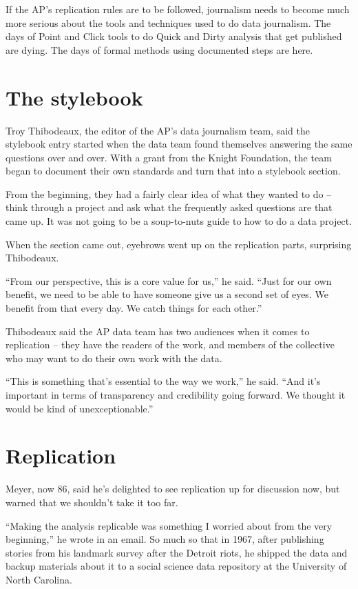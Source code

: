 \documentclass[]{book}
\begin{document}
If the AP's replication rules are to be followed, journalism needs to become much more serious about the tools and techniques used to do data journalism. The days of Point and Click tools to do Quick and Dirty analysis that get published are dying. The days of formal methods using documented steps are here.

\hypertarget{the-stylebook}{%
\section{The stylebook}\label{the-stylebook}}

Troy Thibodeaux, the editor of the AP's data journalism team, said the stylebook entry started when the data team found themselves answering the same questions over and over. With a grant from the Knight Foundation, the team began to document their own standards and turn that into a stylebook section.

From the beginning, they had a fairly clear idea of what they wanted to do -- think through a project and ask what the frequently asked questions are that came up. It was not going to be a soup-to-nuts guide to how to do a data project.

When the section came out, eyebrows went up on the replication parts, surprising Thibodeaux.

``From our perspective, this is a core value for us,'' he said. ``Just for our own benefit, we need to be able to have someone give us a second set of eyes. We benefit from that every day. We catch things for each other.''

Thibodeaux said the AP data team has two audiences when it comes to replication -- they have the readers of the work, and members of the collective who may want to do their own work with the data.

``This is something that's essential to the way we work,'' he said. ``And it's important in terms of transparency and credibility going forward. We thought it would be kind of unexceptionable.''

\hypertarget{replication}{%
\section{Replication}\label{replication}}

Meyer, now 86, said he's delighted to see replication up for discussion now, but warned that we shouldn't take it too far.

``Making the analysis replicable was something I worried about from the very beginning,'' he wrote in an email. So much so that in 1967, after publishing stories from his landmark survey after the Detroit riots, he shipped the data and backup materials about it to a social science data repository at the University of North Carolina.
\end{document}
